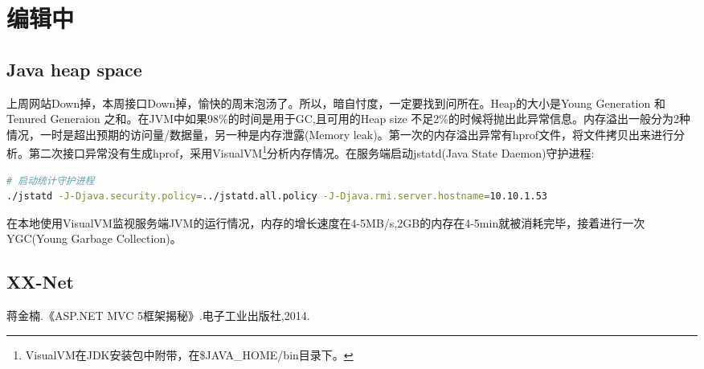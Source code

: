 \documentclass{book}
\begin{document}
\section{编辑中}

\subsection{Java heap space}

上周网站Down掉，本周接口Down掉，愉快的周末泡汤了。所以，暗自忖度，一定要找到问所在。Heap的大小是Young Generation 和Tenured Generaion 之和。在JVM中如果98\%的时间是用于GC,且可用的Heap size 不足2\%的时候将抛出此异常信息。内存溢出一般分为2种情况，一时是超出预期的访问量/数据量，另一种是内存泄露(Memory leak)。第一次的内存溢出异常有hprof文件，将文件拷贝出来进行分析。第二次接口异常没有生成hprof，采用VisualVM\footnote{VisualVM在JDK安装包中附带，在\$JAVA\_HOME/bin目录下。}分析内存情况。在服务端启动jstatd(Java State Daemon)守护进程:

\begin{lstlisting}[language=Bash]
# 启动统计守护进程
./jstatd -J-Djava.security.policy=../jstatd.all.policy -J-Djava.rmi.server.hostname=10.10.1.53
\end{lstlisting}

在本地使用VisualVM监视服务端JVM的运行情况，内存的增长速度在4-5MB/s,2GB的内存在4-5min就被消耗完毕，接着进行一次YGC(Young Garbage Collection)。



\subsection{XX-Net}





\begin{thebibliography}{0}
蒋金楠.《ASP.NET MVC 5框架揭秘》.电子工业出版社,2014.
\end{thebibliography}

\end{document}
